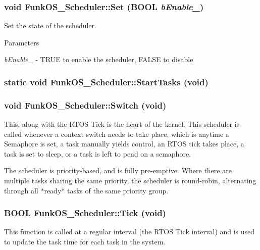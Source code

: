 \subsubsection[{Set}]{\setlength{\rightskip}{0pt plus 5cm}void FunkOS\_\-Scheduler::Set (BOOL {\em bEnable\_\-})\hspace{0.3cm}{\ttfamily  [static]}}\label{class_funk_o_s___scheduler_ab363782eb05d5f9a9a7f023fd4a2a875}
Set the state of the scheduler.


\begin{DoxyParams}{Parameters}
\item[{\em bEnable\_\-}]-\/ TRUE to enable the scheduler, FALSE to disable \end{DoxyParams}
\subsubsection[{StartTasks}]{\setlength{\rightskip}{0pt plus 5cm}static void FunkOS\_\-Scheduler::StartTasks (void)\hspace{0.3cm}{\ttfamily  [static]}}\label{class_funk_o_s___scheduler_ae234968655ef795903b633b3a3ed07a9}
\subsubsection[{Switch}]{\setlength{\rightskip}{0pt plus 5cm}void FunkOS\_\-Scheduler::Switch (void)\hspace{0.3cm}{\ttfamily  [static]}}\label{class_funk_o_s___scheduler_a37fec4fad70de7eee24790851ac140e4}
This, along with the RTOS Tick is the heart of the kernel. This scheduler is called whenever a context switch needs to take place, which is anytime a Semaphore is set, a task manually yields control, an RTOS tick takes place, a task is set to sleep, or a task is left to pend on a semaphore.

The scheduler is priority-\/based, and is fully pre-\/emptive. Where there are multiple tasks sharing the same priority, the scheduler is round-\/robin, alternating through all $\ast$ready$\ast$ tasks of the same priority group. 
\subsubsection[{Tick}]{\setlength{\rightskip}{0pt plus 5cm}BOOL FunkOS\_\-Scheduler::Tick (void)\hspace{0.3cm}{\ttfamily  [static]}}\label{class_funk_o_s___scheduler_a9957c0a67305b3303d95e6540b9cb43d}
This function is called at a regular interval (the RTOS Tick interval) and is used to update the task time for each task in the system.

